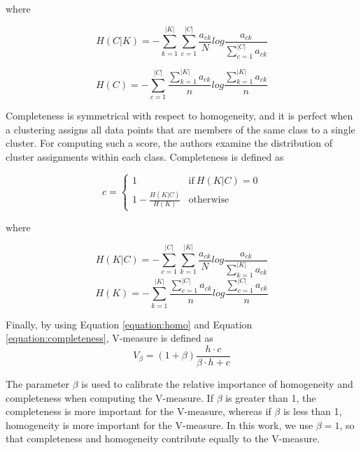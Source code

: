 where

\begin{equation}
    H(C|K) =  -\sum_{k=1}^{|K|}{\sum_{c=1}^{|C|}{\frac{a_{ck}}{N}log\frac{a_{ck}}{\sum_{c=1}^{|C|}{a_{ck}}}}}
\end{equation}

\begin{equation}
    H(C) = -\sum_{c=1}^{|C|}{  \frac{\sum_{k=1}^{|K|}a_{ck}}{n}log \frac{\sum_{k=1}^{|K|}a_{ck}}{n} }
\end{equation}

Completeness is symmetrical with respect to homogeneity, and it is perfect when a clustering assigns all data points that are members of the same class to a single cluster. 
For computing such a score, the authors examine the distribution of cluster assignments within each class.
Completeness is defined as 

\begin{equation}
\label{equation:completeness}
    c = \begin{cases} 1 & \text{if}\ H(K|C) = 0 \\1-\frac{H(K|C)}{H(K)} & \text{otherwise}\end{cases}
\end{equation}

where

\begin{equation}
    H(K|C) =  -\sum_{c=1}^{|C|}{\sum_{k=1}^{|K|}{\frac{a_{ck}}{N}log\frac{a_{ck}}{\sum_{k=1}^{|K|}{a_{ck}}}}}
\end{equation}
\vspace{1em}
\begin{equation}
    H(K) = -\sum_{k=1}^{|K|}{  \frac{\sum_{c=1}^{|C|}a_{ck}}{n}log \frac{\sum_{c=1}^{|C|}a_{ck}}{n} }
\end{equation}

Finally, by using Equation \ref{equation:homo} and Equation \ref{equation:completeness}, V-measure is defined as 
\begin{equation}
    V_{\beta} = (1+\beta)\frac{h\cdot c}{\beta\cdot{h+c}}
\end{equation}

The parameter $\beta$ is used to calibrate the relative importance of homogeneity and completeness when computing the V-measure. If $\beta$ is greater than 1, the completeness is more important for the V-measure, whereas 
if $\beta$ is less than 1, homogeneity is more important for the V-measure. 
In this work, we use $\beta = 1$, so that completeness and homogeneity contribute equally to the V-measure.

